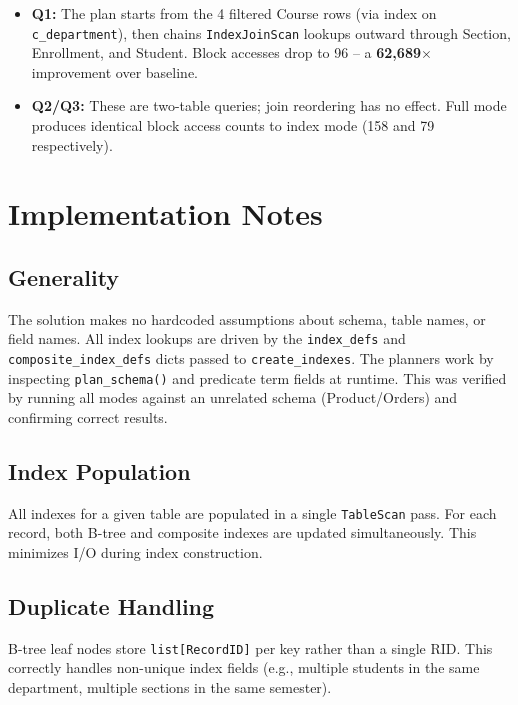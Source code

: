 \documentclass[12pt,a4paper]{article}
\begin{document}
\begin{itemize}[nosep]
  \item \textbf{Q1:} The plan starts from the 4 filtered Course rows (via index on \texttt{c\_department}), then chains \texttt{IndexJoinScan} lookups outward through Section, Enrollment, and Student. Block accesses drop to 96 -- a \textbf{62,689$\times$} improvement over baseline.
  \item \textbf{Q2/Q3:} These are two-table queries; join reordering has no effect. Full mode produces identical block access counts to index mode (158 and 79 respectively).
\end{itemize}

\section{Implementation Notes}

\subsection{Generality}

The solution makes no hardcoded assumptions about schema, table names, or field names. All index lookups are driven by the \texttt{index\_defs} and \texttt{composite\_index\_defs} dicts passed to \texttt{create\_indexes}. The planners work by inspecting \texttt{plan\_schema()} and predicate term fields at runtime. This was verified by running all modes against an unrelated schema (Product/Orders) and confirming correct results.

\subsection{Index Population}

All indexes for a given table are populated in a single \texttt{TableScan} pass. For each record, both B-tree and composite indexes are updated simultaneously. This minimizes I/O during index construction.

\subsection{Duplicate Handling}

B-tree leaf nodes store \texttt{list[RecordID]} per key rather than a single RID. This correctly handles non-unique index fields (e.g., multiple students in the same department, multiple sections in the same semester).
\end{document}
